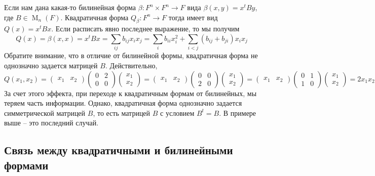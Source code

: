 Если нам дана какая-то билинейная форма $\beta \colon F^n\times F^n\to F$ вида $\beta(x, y) = x^t B y$, где $B\in \operatorname{M}_n(F)$.
Квадратичная форма $Q_\beta\colon F^n\to F$ тогда имеет вид $Q(x) = x^t B x$.
Если расписать явно последнее выражение, то мы получим
\[
Q(x) = \beta(x,x) = x^t B x = \sum_{ij} b_{ij}x_ix_j = \sum_{i}b_{ii}x_i^2+ \sum_{i<j}(b_{ij} + b_{ji})x_i x_j
\]
Обратите внимание, что в отличие от билинейной формы, квадратичная форма не однозначно задается матрицей $B$.
Действительно, 
\[
Q(x_1,x_2) = 
\begin{pmatrix}
{x_1}&{x_2}
\end{pmatrix}
\begin{pmatrix}
{0}&{2}\\
{0}&{0}
\end{pmatrix}
\begin{pmatrix}
{x_1}\\{x_2}
\end{pmatrix}=
\begin{pmatrix}
{x_1}&{x_2}
\end{pmatrix}
\begin{pmatrix}
{0}&{0}\\
{2}&{0}
\end{pmatrix}
\begin{pmatrix}
{x_1}\\{x_2}
\end{pmatrix}=
\begin{pmatrix}
{x_1}&{x_2}
\end{pmatrix}
\begin{pmatrix}
{0}&{1}\\
{1}&{0}
\end{pmatrix}
\begin{pmatrix}
{x_1}\\{x_2}
\end{pmatrix}
=2x_1x_2
\]
За счет этого эффекта, при переходе к квадратичным формам от билинейных, мы теряем часть информации.
Однако, квадратичная форма однозначно задается симметрической матрицей $B$, то есть матрицей $B$ с условием $B^t = B$.
В примере выше -- это последний случай.


\subsection{Связь между квадратичными и билинейными формами}


